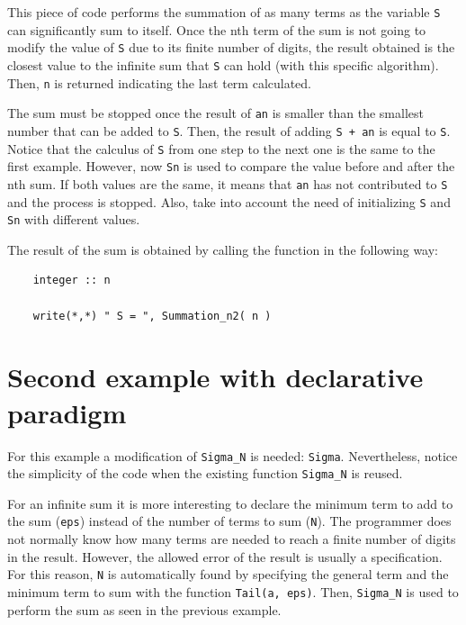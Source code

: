 This piece of code performs the summation of as many terms as 
the variable \texttt{S} can significantly sum to itself. 
Once the nth term of the sum is not going 
to modify the value of \texttt{S} due to its finite number of digits, 
the result obtained is the closest value
to the infinite sum that \texttt{S} can hold (with this specific algorithm). 
Then, \texttt{n} is returned indicating the last term calculated. 

The sum must be stopped once the result of \texttt{an} is smaller than the 
smallest number that can be added to \texttt{S}. Then, the result of 
adding \texttt{S + an} is equal to \texttt{S}. Notice that the calculus of \texttt{S}
from one step to the next one is the same to the first example. However, now \texttt{Sn}
is used to compare the value before and after the nth sum. If both values are the same, 
it means that \texttt{an} has not contributed to \texttt{S} and the process is stopped. Also, 
take into account the need of
initializing \texttt{S} and \texttt{Sn} with different values.
 
The result of the sum is obtained by calling the function in the following way:
\begin{verbatim} 
    integer :: n
    
    write(*,*) " S = ", Summation_n2( n )
\end{verbatim}




\newpage
\section{Second example with declarative paradigm}
For this example a modification of \texttt{Sigma\_N} is needed: \texttt{Sigma}. Nevertheless, notice the simplicity of the code when 
the existing function \texttt{Sigma\_N} is reused.

For an infinite sum it is more interesting to declare the minimum term to add to the sum (\texttt{eps}) instead of the number of 
terms to sum (\texttt{N}). The programmer does not normally know how many terms are needed to reach a finite number of digits in the result.
However, the allowed error of the result is usually a specification. 
For this reason, \texttt{N} is automatically found by specifying the general term and the 
minimum term to sum with the function \texttt{Tail(a, eps)}. 
Then, \texttt{Sigma\_N} is used to perform the sum as seen in the previous example. 

